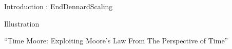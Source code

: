 \begin{Frame}{Introduction : EndDennardScaling}
      \begin{block}{Illustration}

    \end{block}

``Time Moore: Exploiting Moore's Law From The Perspective of Time''
\end{Frame}

